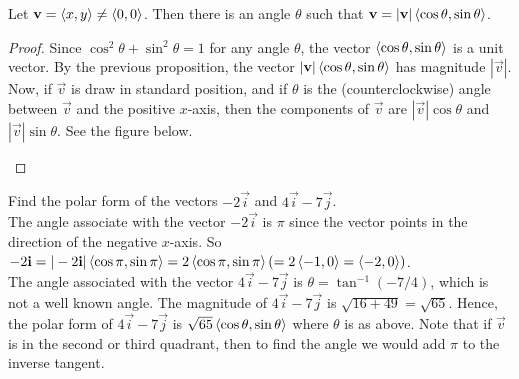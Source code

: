 \documentclass[handout]{ximera}
\begin{document}
\begin{proposition}
Let $\mathbf{v} = \left\langle x,y\right\rangle \neq \left\langle 0,0\right\rangle$.  Then there is an angle $\theta$ such that $\mathbf{v} = |\mathbf{v}| \left\langle \cos \theta, \sin \theta\right\rangle$.
\begin{proof}
Since $\cos^2\theta + \sin^2\theta = 1$ for any angle $\theta$, the vector $\left\langle \cos \theta, \sin \theta\right\rangle$ is a unit vector.
By the previous proposition, the vector $|\mathbf{v}| \left\langle \cos \theta, \sin \theta\right\rangle$ has magnitude $|\vec{v}|$. 
Now, if $\vec{v}$ is draw in standard position, and if $\theta$ is the (counterclockwise) angle between $\vec{v}$ and the positive $x$-axis, 
then the components of $\vec{v}$ are $|\vec{v}|\cos \theta$ and $|\vec{v}|\sin \theta$.  See the figure below.


\begin{image}
\end{image}


\end{proof}
\end{proposition}

\begin{example}
Find the polar form of the vectors $-2\vec{i}$ and $4\vec{i}-7\vec{j}$.\\
The angle associate with the vector $-2\vec{i}$ is $\pi$ since the vector points in the direction of the negative $x$-axis.
So $-2\mathbf{i} = |-2\mathbf{i}| \left\langle \cos \pi, \sin \pi\right\rangle = 2\left\langle \cos \pi, \sin \pi\right\rangle (= 2\left\langle -1, 0\right\rangle = \left\langle -2, 0\right\rangle)$.\\
The angle associated with the vector $4\vec{i}-7\vec{j}$ is $\theta = \tan^{-1}(-7/4)$, which is not a well known angle.
The magnitude of $4\vec{i}-7\vec{j}$ is $\sqrt{16 +49} = \sqrt{65}$.  Hence, the polar form of $4\vec{i}-7\vec{j}$ is
$\sqrt{65}\left\langle \cos \theta, \sin\theta\right\rangle$ where $\theta$ is as above. Note that if $\vec{v}$ is in the second or third quadrant, then 
to find the angle we would add $\pi$ to the inverse tangent.
\end{example}
\end{document}
